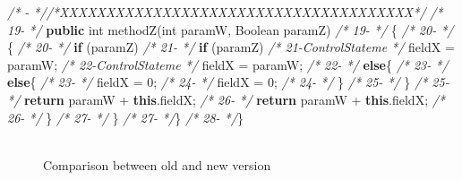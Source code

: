 \documentclass[
]{article}
\newenvironment{Shaded}{\begin{snugshade}}{\end{snugshade}}
\newcommand{\BuiltInTok}[1]{#1}
\newcommand{\CommentTok}[1]{\textcolor[rgb]{0.56,0.35,0.01}{\textit{#1}}}
\newcommand{\DataTypeTok}[1]{\textcolor[rgb]{0.13,0.29,0.53}{#1}}
\newcommand{\DecValTok}[1]{\textcolor[rgb]{0.00,0.00,0.81}{#1}}
\newcommand{\FunctionTok}[1]{\textcolor[rgb]{0.00,0.00,0.00}{#1}}
\newcommand{\KeywordTok}[1]{\textcolor[rgb]{0.13,0.29,0.53}{\textbf{#1}}}
\newcommand{\NormalTok}[1]{#1}
\begin{document}
\begin{landscape}
\begin{Shaded}
\begin{Highlighting}[]
\CommentTok{/*   -                 *//*XXXXXXXXXXXXXXXXXXXXXXXXXXXXXXXXXXXXXX*/}                     \CommentTok{/* 19-                 */}    \KeywordTok{public} \DataTypeTok{int} \FunctionTok{methodZ}\NormalTok{(}\DataTypeTok{int}\NormalTok{ paramW, }\BuiltInTok{Boolean}\NormalTok{ paramZ)             }
\CommentTok{/* 19-                 */}\NormalTok{    \{                                                          }\CommentTok{/* 20-                 */}\NormalTok{    \{                                                          }
\CommentTok{/* 20-                 */}        \KeywordTok{if}\NormalTok{ (paramZ)                                            }\CommentTok{/* 21-                 */}        \KeywordTok{if}\NormalTok{ (paramZ)                                            }
\CommentTok{/* 21-ControlStateme   */}\NormalTok{            fieldX = paramW;                                   }\CommentTok{/* 22-ControlStateme   */}\NormalTok{            fieldX = paramW;                                   }
\CommentTok{/* 22-                 */}        \KeywordTok{else}\NormalTok{\{                                                  }\CommentTok{/* 23-                 */}        \KeywordTok{else}\NormalTok{\{                                                  }
\CommentTok{/* 23-                 */}\NormalTok{            fieldX = }\DecValTok{0}\NormalTok{;                                        }\CommentTok{/* 24-                 */}\NormalTok{            fieldX = }\DecValTok{0}\NormalTok{;                                        }
\CommentTok{/* 24-                 */}\NormalTok{        \}                                                      }\CommentTok{/* 25-                 */}\NormalTok{        \}                                                      }
\CommentTok{/* 25-                 */}        \KeywordTok{return}\NormalTok{ paramW + }\KeywordTok{this}\NormalTok{.}\FunctionTok{fieldX}\NormalTok{;                           }\CommentTok{/* 26-                 */}        \KeywordTok{return}\NormalTok{ paramW + }\KeywordTok{this}\NormalTok{.}\FunctionTok{fieldX}\NormalTok{;                           }
\CommentTok{/* 26-                 */}\NormalTok{     \}                                                         }\CommentTok{/* 27-                 */}\NormalTok{     \}                                                         }
\CommentTok{/* 27-                 */}\NormalTok{\}                                                              }\CommentTok{/* 28-                 */}\NormalTok{\}                                                              }
\end{Highlighting}
\end{Shaded}

\normalsize

\begin{figure}
\centering
\includegraphics{figures/fake.png}
\caption{Comparison between old and new version
\label{comparison_rename}}
\end{figure}

\end{landscape}
\end{document}
